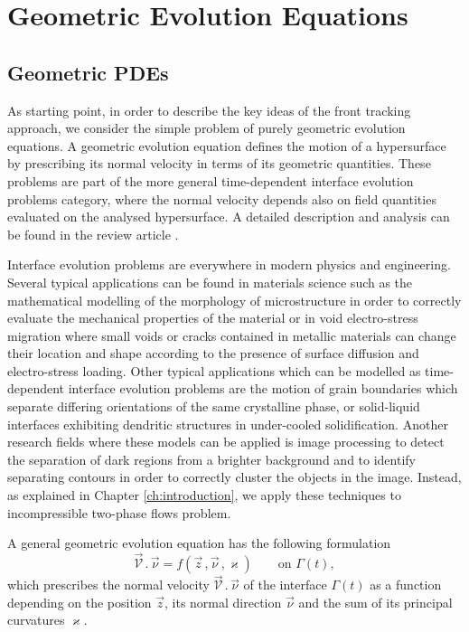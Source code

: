 \chapter{\sc Geometric Evolution Equations}
\label{ch:1}

\section[Geometric PDEs]{Geometric PDEs}
As starting point, in order to describe the key ideas of the front tracking
approach, we consider the simple problem of purely geometric evolution
equations. A geometric evolution equation defines the motion of a hypersurface
by prescribing its normal velocity in terms of its geometric quantities. These
problems are part of the more general time-dependent interface evolution
problems category, where the normal velocity depends also on field quantities
evaluated on the analysed hypersurface. A detailed description and analysis can
be found in the review article \cite{DeckelnickDE05}.

Interface evolution problems are everywhere in modern physics and engineering.
Several typical applications can be found in materials science such as the
mathematical modelling of the morphology of microstructure in order to
correctly evaluate the mechanical properties of the material or in void
electro-stress migration where small voids or cracks contained in metallic
materials can change their location and shape according to the presence of
surface diffusion and electro-stress loading. Other typical applications which
can be modelled as time-dependent interface evolution problems are the motion of
grain boundaries which separate differing orientations of the same crystalline
phase, or solid-liquid interfaces exhibiting dendritic structures in
under-cooled solidification. Another research fields where these models can be
applied is image processing to detect the separation of dark regions from a
brighter background and to identify separating contours in order to correctly
cluster the objects in the image. Instead, as explained in Chapter
\ref{ch:introduction}, we apply these techniques to incompressible two-phase
flows problem.

A general geometric evolution equation has the following formulation
\begin{equation}\label{eq:geometric_pde}
\vec{\mathcal{V}}\,.\,\vec\nu=f(\vec{z}\,,\vec{\nu}\,,\varkappa)
\qquad\mbox{on }\Gamma(t),
\end{equation}
which prescribes the normal velocity $\vec{\mathcal{V}}\,.\,\vec\nu$ of the
interface $\Gamma(t)$ as a function depending on the position $\vec z$, its
normal direction $\vec{\nu}$ and the sum of its principal curvatures
$\varkappa$.

